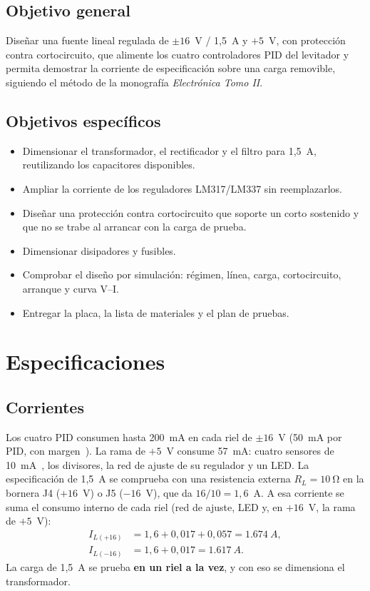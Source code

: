 \documentclass[conference]{IEEEtran}
\begin{document}
\subsection{Objetivo general}
Diseñar una fuente lineal regulada de $\pm16$~V / 1,5~A y $+5$~V, con protección contra cortocircuito, que alimente los cuatro controladores PID del levitador y permita demostrar la corriente de especificación sobre una carga removible, siguiendo el método de la monografía \emph{Electrónica Tomo II}.

\subsection{Objetivos específicos}
\begin{itemize}
\item Dimensionar el transformador, el rectificador y el filtro para 1,5~A, reutilizando los capacitores disponibles.
\item Ampliar la corriente de los reguladores LM317/LM337 sin reemplazarlos.
\item Diseñar una protección contra cortocircuito que soporte un corto sostenido y que no se trabe al arrancar con la carga de prueba.
\item Dimensionar disipadores y fusibles.
\item Comprobar el diseño por simulación: régimen, línea, carga, cortocircuito, arranque y curva V--I.
\item Entregar la placa, la lista de materiales y el plan de pruebas.
\end{itemize}

\section{Especificaciones}
\subsection{Corrientes}
Los cuatro PID consumen hasta 200~mA en cada riel de $\pm16$~V (50~mA por PID, con margen~\cite{tl074}). La rama de $+5$~V consume 57~mA: cuatro sensores de 10~mA~\cite{ss495a}, los divisores, la red de ajuste de su regulador y un LED. La especificación de 1,5~A se comprueba con una resistencia externa $R_L=\SI{10}{\ohm}$ en la bornera J4 ($+16$~V) o J5 ($-16$~V), que da $16/10=1{,}6$~A. A esa corriente se suma el consumo interno de cada riel (red de ajuste, LED y, en $+16$~V, la rama de $+5$~V):
\begin{align}
I_{L(+16)}&=1{,}6+0{,}017+0{,}057=\SI{1,674}{A},\\
I_{L(-16)}&=1{,}6+0{,}017=\SI{1,617}{A}.
\end{align}
La carga de 1,5~A se prueba \textbf{en un riel a la vez}, y con eso se dimensiona el transformador.
\end{document}
